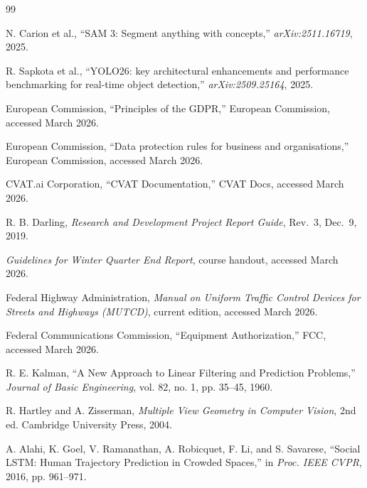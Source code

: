 \documentclass[12pt,letterpaper]{article}
\begin{document}
\begin{thebibliography}{99}

N. Carion et al., ``SAM 3: Segment anything with concepts,'' \textit{arXiv:2511.16719}, 2025.

R. Sapkota et al., ``YOLO26: key architectural enhancements and performance benchmarking for real-time object detection,'' \textit{arXiv:2509.25164}, 2025.

European Commission, ``Principles of the GDPR,'' European Commission, accessed March 2026.

European Commission, ``Data protection rules for business and organisations,'' European Commission, accessed March 2026.

CVAT.ai Corporation, ``CVAT Documentation,'' CVAT Docs, accessed March 2026.

R. B. Darling, \textit{Research and Development Project Report Guide}, Rev.\ 3, Dec.\ 9, 2019.

\textit{Guidelines for Winter Quarter End Report}, course handout, accessed March 2026.

Federal Highway Administration, \textit{Manual on Uniform Traffic Control Devices for Streets and Highways (MUTCD)}, current edition, accessed March 2026.

Federal Communications Commission, ``Equipment Authorization,'' FCC, accessed March 2026.

R. E. Kalman, ``A New Approach to Linear Filtering and Prediction Problems,'' \textit{Journal of Basic Engineering}, vol. 82, no. 1, pp. 35--45, 1960.

R. Hartley and A. Zisserman, \textit{Multiple View Geometry in Computer Vision}, 2nd ed. Cambridge University Press, 2004.

A. Alahi, K. Goel, V. Ramanathan, A. Robicquet, F. Li, and S. Savarese, ``Social LSTM: Human Trajectory Prediction in Crowded Spaces,'' in \textit{Proc. IEEE CVPR}, 2016, pp. 961--971.

\end{thebibliography}
\end{document}
